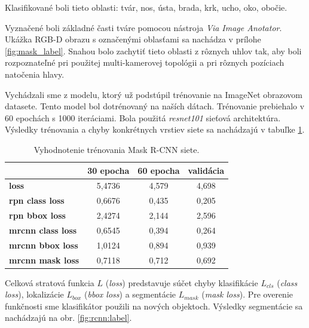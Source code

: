 \noindent Klasifikované boli tieto oblasti: tvár, nos, ústa, brada, krk, ucho, oko, obočie. \newline

Vyznačené boli základné časti tváre pomocou nástroja \textit{Via Image Anotator}. Ukážka RGB-D obrazu s označenými oblasťami sa nachádza v prílohe \ref{fig:mask_label}. Snahou bolo zachytiť tieto oblasti z rôznych uhlov tak, aby boli rozpoznateľné pri použitej multi-kamerovej topológii a pri rôznych pozíciach natočenia hlavy. 

Vychádzali sme z modelu, ktorý už podstúpil trénovanie na ImageNet obrazovom datasete. Tento model bol dotrénovaný na naších dátach. Trénovanie prebiehalo v 60 epochách s  1000 iteráciami. Bola použitá \textit{resnet101} sieťová architektúra. Výsledky trénovania a chyby konkrétnych vrstiev siete sa nachádzajú v tabuľke \ref{tab:rcnn:results}. 

\begin{table}[h]
	\caption{\label{tab:rcnn:results} Vyhodnotenie trénovania Mask R-CNN siete.}
	\centering
	\begin{tabular}{lccc}
		\toprule
		\textbf{} & \textbf{30 epocha} & \textbf{60 epocha} & \textbf{validácia} \\ 
		\midrule
		\textbf{loss} 					& 5,4736 	& 4,579 & 4,698	\\
		\textbf{rpn class loss} 		& 0,6676 	& 0,435 & 0,205	\\
		\textbf{rpn bbox loss} 			& 2,4274	& 2,144 & 2,596	\\
		\textbf{mrcnn class loss} 		& 0,6545	& 0,394 & 0,264	\\
		\textbf{mrcnn bbox loss} 		& 1,0124	& 0,894	& 0,939	\\
		\textbf{mrcnn mask loss} 		& 0,7118	& 0,712	& 0,692	\\
		\bottomrule
	\end{tabular}
\end{table}

Celková stratová funkcia $L$ (\textit{loss}) predstavuje súčet chyby klasifikácie $L_{cls}$ (\textit{class loss}), lokalizácie $L_{box}$ (\textit{bbox loss}) a segmentácie $ L_{mask}$ (\textit{mask loss}). Pre overenie funkčnosti sme klasifikátor použili na nových objektoch. Výsledky segmentácie sa nachádzajú na obr. \ref{fig:rcnn:label}.


